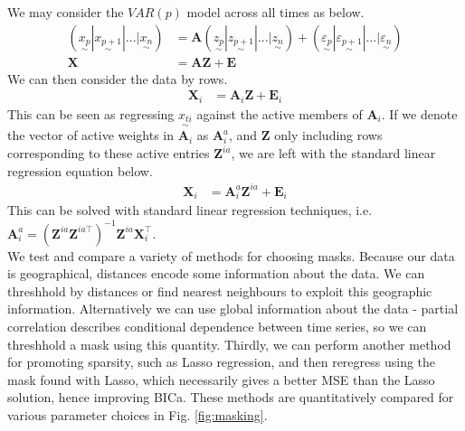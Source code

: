 \documentclass[12pt,a4paper]{article} %
\newcommand{\ve}[1]{\underset{\sim}{#1}}
\begin{document}
We may consider the $VAR(p)$ model across all times as below.
\begin{align*}
    (\ve{x_p}|\ve{x_{p+1}}|...|\ve{x_n})&=\pmb{A}(\ve{z_p}|\ve{z_{p+1}}|...|\ve{z_n})+(\ve{\varepsilon_p}|\ve{\varepsilon_{p+1}}|...|\ve{\varepsilon_n})\\
    \pmb{X}&=\pmb{A}\pmb{Z}+\pmb{E}
\end{align*}
We can then consider the data by rows.
\begin{align*}
    \pmb{X}_i&=\pmb{A}_i\pmb{Z}+\pmb{E}_i
\end{align*}
This can be seen as regressing $\ve{x_{ti}}$ against the active members of $\pmb{A}_i$. If we denote the vector of active weights in $\pmb{A}_i$ as $\pmb{A}_i^a$, and $\pmb{Z}$ only including rows corresponding to these active entries $\pmb{Z}^{ia}$, we are left with the standard linear regression equation below.
\begin{align*}
    \pmb{X}_i&=\pmb{A}_i^a\pmb{Z}^{ia}+\pmb{E}_i
\end{align*}
This can be solved with standard linear regression techniques, i.e. $\pmb{A}_i^a=(\pmb{Z}^{ia}\pmb{Z}^{ia\top})^{-1}\pmb{Z}^{ia}\pmb{X}_i^\top$.\\
We test and compare a variety of methods for choosing masks. Because our data is geographical, distances encode some information about the data. We can threshhold by distances or find nearest neighbours to exploit this geographic information. Alternatively we can use global information about the data - partial correlation describes conditional dependence between time series, so we can threshhold a mask using this quantity. Thirdly, we can perform another method for promoting sparsity, such as Lasso regression, and then reregress using the mask found with Lasso, which necessarily gives a better MSE than the Lasso solution, hence improving BICa. These methods are quantitatively compared for various parameter choices in Fig. \ref{fig:masking}.
\end{document}
